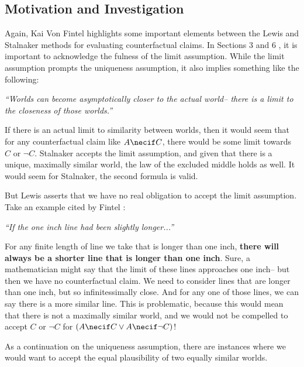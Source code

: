 \documentclass{article}
\begin{document}
    \subsection{Motivation and Investigation}
    Again, Kai Von Fintel highlights some important elements between the Lewis and Stalnaker methods for evaluating counterfactual claims. In Sections 3 and 6 \cite{fintel}, it is important to acknowledge the fulness of the limit assumption.
    While the limit assumption prompts the uniqueness assumption, it also implies something like the following: 
    
    \begin{center}
        \textit{``Worlds can become asymptotically closer to the actual world-- there is a limit to the closeness of those worlds.''}
    \end{center}

    If there is an actual limit to similarity between worlds, then it would seem that for any counterfactual claim like $A \necif C$, there would be some limit towards $C$ or $\lnot C$. 
    Stalnaker accepts the limit assumption, and given that there is a unique, maximally similar world, the law of the excluded middle holds as well. 
    It would seem for Stalnaker, the second formula is valid.

    But Lewis asserts that we have no real obligation to accept the limit assumption.
    Take an example cited by Fintel \cite{fintel}:

    \begin{center}
        \textit{``If the one inch line had been slightly longer...''}
    \end{center}

    For any finite length of line we take that is longer than one inch, \textbf{there will always be a shorter line that is longer than one inch}.
    Sure, a mathematician might say that the limit of these lines approaches one inch-- but then we have no counterfactual claim.
    We need to consider lines that are longer than one inch, but so infinitessimally close. And for any one of those lines, we can say there is a more similar line. 
    This is problematic, because this would mean that there is not a maximally similar world, and we would not be compelled to accept $C$ or $\lnot C$ for $(A \necif C \vee A \necif \lnot C)$! 

    As a continuation on the uniqueness assumption, there are instances where we would want to accept the equal plausibility of two equally similar worlds. 
    
\end{document}
